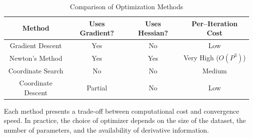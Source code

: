 \documentclass{article}
\begin{document}
\begin{table}[H]
\centering
\begin{tabular}{c|c|c|c}
\textbf{Method} & \textbf{Uses Gradient?} & \textbf{Uses Hessian?} & \textbf{Per–Iteration Cost} \\
\hline
Gradient Descent & Yes & No & Low \\
Newton’s Method & Yes & Yes & Very High ($O(P^3)$) \\
Coordinate Search & No & No & Medium \\
Coordinate Descent & Partial & No & Low \\
\end{tabular}
\caption{Comparison of Optimization Methods}
\end{table}

Each method presents a trade-off between computational cost and convergence speed. In practice, the choice of optimizer depends on the size of the dataset, the number of parameters, and the availability of derivative information.






\end{document}
